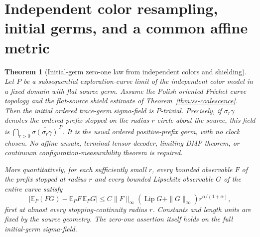 \documentclass[11pt]{article}
\newtheorem{theorem}{Theorem}[section]
\theoremstyle{definition}\newtheorem{definition}[theorem]{Definition}
\theoremstyle{remark}\newtheorem{remark}[theorem]{Remark}
\begin{document}
\section{Independent color resampling, initial germs, and a common affine metric}
\label{sec:affine-mixture-purity}


\begin{theorem}[Initial-germ zero-one law from independent colors and shielding]
\label{thm:ed-germzeroone}
Let $P$ be a subsequential exploration-curve limit of the independent
color model in a fixed domain with flat source germ. Assume the Polish
oriented Fr\'echet curve topology and the flat-source shield estimate of
Theorem~\ref{thm:ss-coalescence}. Then the initial ordered trace-germ
sigma-field is $P$-trivial. Precisely, if $\sigma_r\gamma$ denotes the
ordered prefix stopped on the radius-$r$ circle about the source, this
field is $\bigcap_{r>0}\overline{\sigma(\sigma_r\gamma)}^{\,P}$.
It is the usual ordered positive-prefix germ, with no clock chosen.
No affine ansatz, terminal tensor decoder,
limiting DMP theorem, or continuum configuration-measurability theorem
is required.

More quantitatively, for each sufficiently small $r$, every bounded
observable $F$ of the prefix stopped at radius $r$ and every bounded
Lipschitz observable $G$ of the entire curve satisfy
\[
 \left|\mathbb E_P(FG)-\mathbb E_PF\,\mathbb E_PG\right|
 \leq C\|F\|_\infty
   (\operatorname{Lip}G+\|G\|_\infty)r^{\alpha/(1+\alpha)},
 \tag{EDG}
\]
first at almost every stopping-continuity radius $r$. Constants and
length units are fixed by the source geometry. The zero-one assertion
itself holds on the full initial-germ sigma-field.
\end{theorem}
\end{document}
